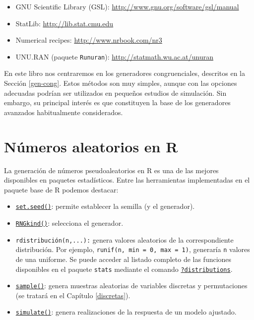 \documentclass[
  10pt,
]{book}
\theoremstyle{break}
\theoremstyle{nonumberplain}
\begin{document}
\begin{itemize}
\item
  GNU Scientific Library (GSL):
  \href{http://www.gnu.org/software/gsl/manual/html_node/Random-Number-Generation.html}{http://www.gnu.org/software/gsl/manual}
\item
  StatLib: \url{http://lib.stat.cmu.edu}
\item
  Numerical recipes: \url{http://www.nrbook.com/nr3}
\item
  UNU.RAN (paquete \texttt{Runuran}):
  \url{http://statmath.wu.ac.at/unuran}
\end{itemize}

En este libro nos centraremos en los generadores congruenciales, descritos en la Sección \ref{gen-cong}.
Estos métodos son muy simples, aunque con las opciones adecuadas podrían ser utilizados en pequeños estudios de simulación. Sin embargo, su principal interés es que constituyen la base de los generadores avanzados habitualmente considerados.

\hypertarget{rrng}{%
\section{Números aleatorios en R}\label{rrng}}

La generación de números pseudoaleatorios en R es una de las mejores
disponibles en paquetes estadísticos.
Entre las herramientas implementadas en el paquete base de R podemos destacar:

\begin{itemize}
\item
  \href{https://rdrr.io/r/base/Random.html}{\texttt{set.seed()}}: permite establecer la semilla (y el generador).
\item
  \href{https://rdrr.io/r/base/Random.html}{\texttt{RNGkind()}}: selecciona el generador.
\item
  \texttt{rdistribución(n,...):} genera valores aleatorios de la correspondiente distribución.
  Por ejemplo, \texttt{runif(n,\ min\ =\ 0,\ max\ =\ 1)}, generaría \texttt{n} valores de una uniforme. Se puede acceder al listado completo de las funciones disponibles en el paquete \texttt{stats} mediante el comando \href{https://rdrr.io/r/stats/Distributions.html}{\texttt{?distributions}}.
\item
  \href{https://rdrr.io/r/base/sample.html}{\texttt{sample()}}: genera muestras aleatorias de variables discretas y permutaciones (se tratará en el Capítulo \ref{discretas}).
\item
  \href{https://rdrr.io/r/stats/simulate.html}{\texttt{simulate()}}: genera realizaciones de la respuesta de un modelo ajustado.
\end{itemize}
\end{document}
